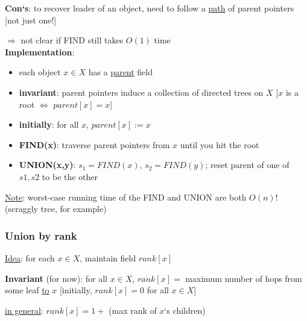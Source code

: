 \documentclass[a4paper,12pt]{article}
\theoremstyle{plain}
\theoremstyle{definition}
\theoremstyle{remark}
\begin{document}
\textbf{Con`s}: to recover leader of an object, need to follow a \underline{path} of parent pointers [not just one!]

$\Rightarrow$ not clear if FIND still takes $O(1)$ time
\\

\textbf{Implementation}:
\begin{itemize}
	\item each object $x \in X$ has a \underline{parent} field
	\item \textbf{invariant}: parent pointers induce a collection of directed trees on $X$ [$x$ is a root $\iff$ $parent[x] = x$]
	\item \textbf{initially}: for all $x$, $parent[x] := x$
	\item \textbf{FIND(x)}: traverse parent pointers from $x$ until you hit the root
	\item \textbf{UNION(x,y)}: $s_1 = FIND(x)$, $s_2 = FIND(y)$; reset parent of one of $s1, s2$ to be the other
\end{itemize}

\underline{Note}: worst-case running time of the FIND and UNION are both $O(n)$! (scraggly tree, for example)


\subsubsection{Union by rank}
\underline{Idea}: for each $x \in X$, maintain field $rank[x]$

\textbf{Invariant} (for now): for all $x \in X$, $rank[x] =$ maximum number of hops from some leaf \underline{to} $x$ [initially, $rank[x] = 0$ for all $x \in X$]

\underline{in general}: $rank[x] = 1 +$ (max rank of $x$`s children)

\end{document}
